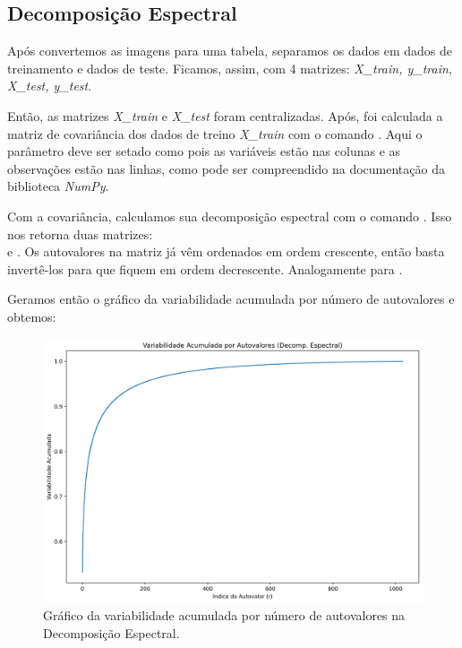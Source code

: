 \documentclass[a4paper, 12pt]{article}
\theoremstyle{definition}
\theoremstyle{remark}
\begin{document}
\subsection{Decomposição Espectral}

Após convertemos as imagens para uma tabela, separamos os dados em dados de treinamento e dados de teste. Ficamos, assim, com 4 matrizes: \textit{X\_train, y\_train, X\_test, y\_test}.

Então, as matrizes \textit{X\_train} e \textit{X\_test} foram centralizadas. Após, foi calculada a matriz de covariância dos dados de treino \textit{X\_train} com o comando . Aqui o parâmetro  deve ser setado como  pois as variáveis estão nas colunas e as observações estão nas linhas, como pode ser compreendido na documentação da biblioteca \textit{NumPy}.

Com a covariância, calculamos sua decomposição espectral com o comando . Isso nos retorna duas matrizes:\\  e . Os autovalores na matriz  já vêm ordenados em ordem crescente, então basta invertê-los para que fiquem em ordem decrescente. Analogamente para .

Geramos então o gráfico da variabilidade acumulada por número de autovalores e obtemos:

\begin{figure}[H]
  \centering
  \includegraphics[width=12cm]{var_acu_espectral}
  \caption{Gráfico da variabilidade acumulada por número de autovalores na Decomposição Espectral.}
\end{figure}
\end{document}
